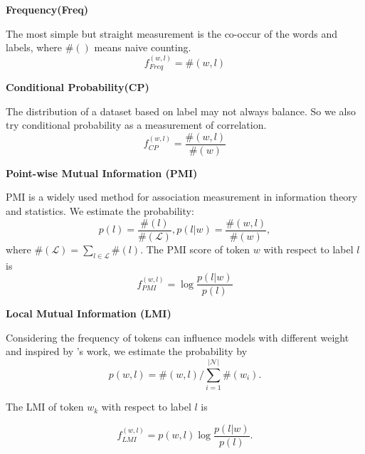 
\noindent\textbf{Frequency(Freq)}

The most simple but straight measurement is the co-occur of the 
words and labels, where $\#()$ means naive counting.
\begin{equation}
    f_{Freq}^{(w,l)} = \#(w, l)
\end{equation}

\noindent\textbf{Conditional Probability(CP)}

The distribution of a dataset based on label may not always balance. 
So we also try conditional probability as a measurement of correlation.
\begin{equation}
    f_{CP}^{(w,l)} = \frac{\#(w, l)}{\#(w)}
\end{equation}

\noindent\textbf{Point-wise Mutual Information (PMI)}

PMI is a widely used method for association measurement in information theory and statistics.
We estimate the probability:
\begin{equation}
p(l) = \frac{\#(l)}{\#(\mathcal{L})}, p(l|w) = \frac{\#(w, l)}{\#(w)},
\end{equation}
where $\#(\mathcal{L}) = \sum_{l\in \mathcal{L}} \#(l)$.
The PMI score of token $w$ with respect to label $l$ is
\begin{equation}
    f_{PMI}^{(w,l)} = \log \frac{p(l|w)}{p(l)}
\end{equation}

\noindent\textbf{Local Mutual Information (LMI)}

Considering the frequency of tokens can influence models with different weight and inspired 
by \citealp{schuster2019towards}'s work,
we estimate the probability by
\begin{equation}
    p(w, l) = \#(w, l) / \sum_{i=1}^{|\mathcal{N}|}\#(w_i).
\end{equation}

The LMI of token $w_k$ with respect to label $l$ is 

\begin{equation}
    f_{LMI}^{(w,l)} = p(w, l)\log \frac{p(l|w)}{p(l)}.
\end{equation}

